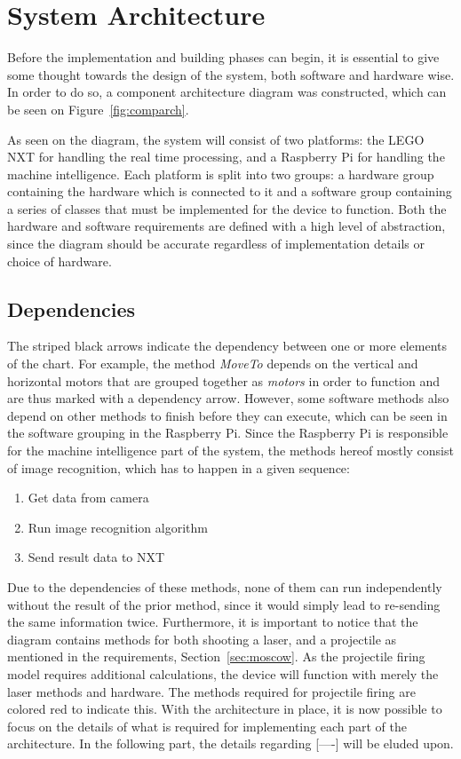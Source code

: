 \section{System Architecture}
Before the implementation and building phases can begin, it is essential to give some thought towards the design of the system, both software and hardware wise.
In order to do so, a component architecture diagram was constructed, which can be seen on Figure~\ref{fig:comparch}.

As seen on the diagram, the system will consist of two platforms: the LEGO NXT for handling the real time processing, and a Raspberry Pi for handling the machine intelligence.
Each platform is split into two groups: a hardware group containing the hardware which is connected to it and a software group containing a series of classes that must be implemented for the device to function.
Both the hardware and software requirements are defined with a high level of abstraction, since the diagram should be accurate regardless of implementation details or choice of hardware.
 
\subsection*{Dependencies}
The striped black arrows indicate the dependency between one or more elements of the chart. 
For example, the method \textit{MoveTo} depends on the vertical and horizontal motors that are grouped together as \textit{motors} in order to function and are thus marked with a dependency arrow.
However, some software methods also depend on other methods to finish before they can execute, which can be seen in the software grouping in the Raspberry Pi.
Since the Raspberry Pi is responsible for the machine intelligence part of the system, the methods hereof mostly consist of image recognition, which has to happen in a given sequence:
\begin{enumerate}
\item Get data from camera
\item Run image recognition algorithm
\item Send result data to NXT
\end{enumerate}

Due to the dependencies of these methods, none of them can run independently without the result of the prior method, since it would simply lead to re-sending the same information twice.
Furthermore, it is important to notice that the diagram contains methods for both shooting a laser, and a projectile as mentioned in the requirements, Section~\ref{sec:moscow}.
As the projectile firing model requires additional calculations, the device will function with merely the laser methods and hardware. 
The methods required for projectile firing are colored red to indicate this.
With the architecture in place, it is now possible to focus on the details of what is required for implementing each part of the architecture.
In the following part, the details regarding [----] will be eluded upon.
